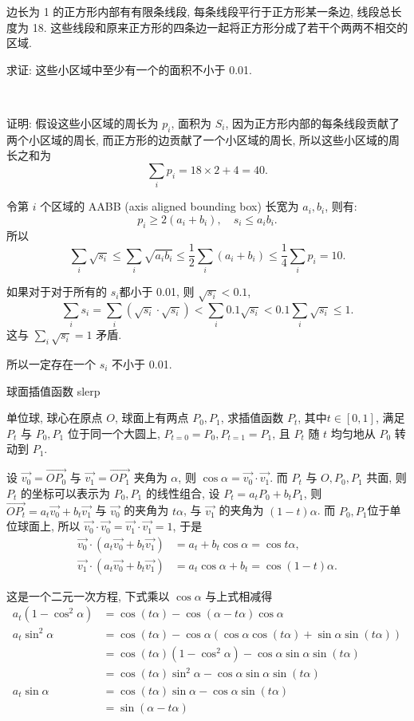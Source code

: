边长为 1 的正方形内部有有限条线段, 
每条线段平行于正方形某一条边, 线段总长度为 18. 
这些线段和原来正方形的四条边一起将正方形分成了若干个两两不相交的区域.

求证: 这些小区域中至少有一个的面积不小于 0.01.

~

证明: 假设这些小区域的周长为 $ p_i $, 面积为 $ S_i $, 因为正方形内部的每条线段贡献了两个小区域的周长, 而正方形的边贡献了一个小区域的周长, 所以这些小区域的周长之和为 
\[ \sum_i{p_i} = 18\times 2 + 4 = 40 .\]

令第 $ i $ 个区域的 AABB (axis aligned bounding box) 长宽为 $ a_i, b_i $, 则有:
\[ p_i \ge 2(a_i+b_i),\quad s_i \le a_i b_i .\]
所以
\[ \sum_i{\sqrt{s_i}} \le \sum_i{\sqrt{a_i b_i}} \le \frac{1}{2}\sum_i{(a_i+b_i)} \le \frac{1}{4}\sum_i{p_i} = 10 .\]

如果对于对于所有的 $ s_i $都小于 0.01, 则 $ \sqrt{s_i} < 0.1 $, 
\[ \sum_i{s_i} = \sum_i{(\sqrt{s_i}\cdot\sqrt{s_i})} < \sum_i{0.1\sqrt{s_i}} < 0.1\sum_i{\sqrt{s_i}} \le 1 .\]
这与 $ \sum_i{\sqrt{s_i}} = 1 $ 矛盾.

所以一定存在一个 $ s_i $ 不小于 0.01.

\newpage

\noindent 球面插值函数 slerp 

单位球, 球心在原点 $O$, 球面上有两点 $P_0, P_1$, 求插值函数 $P_t$, 其中$t\in[0,1]$, 满足 $P_t$ 与 $P_0, P_1$ 位于同一个大圆上, $P_{t=0} = P_0, P_{t=1}=P_1$, 且 $P_t$ 随 $t$ 均匀地从 $P_0$ 转动到 $P_1$. 

设 $\vec{v_0} = \vec{OP_0}$ 与 $\vec{v_1} = \vec{OP_1}$ 夹角为 $\alpha$, 则 $\cos\alpha = \vec{v_0}\cdot\vec{v_1}$. 而 $P_t$ 与 $O,P_0, P_1$ 共面, 则 $P_t$ 的坐标可以表示为 $P_0, P_1$ 的线性组合, 设 $P_t = a_t P_0 + b_tP_1$, 则 $\vec{OP_t} = a_t \vec{v_0} + b_t \vec{v_1}$ 与 $\vec{v_0}$ 的夹角为 $t\alpha$, 与 $\vec{v_1}$ 的夹角为 $(1-t)\alpha$. 而 $P_0, P_1$位于单位球面上, 所以 $\vec{v_0}\cdot\vec{v_0}=\vec{v_1}\cdot\vec{v_1} = 1$, 于是
\begin{align*}
\vec{v_0}\cdot(a_t \vec{v_0} + b_t \vec{v_1}) &= a_t + b_t\cos\alpha = \cos t\alpha ,\\
\vec{v_1}\cdot(a_t \vec{v_0} + b_t \vec{v_1}) &= a_t\cos\alpha + b_t = \cos (1-t)\alpha .
\end{align*}

这是一个二元一次方程, 下式乘以 $\cos\alpha$ 与上式相减得
\begin{align*}
a_t(1-\cos^2\alpha) &= \cos(t\alpha) - \cos(\alpha-t\alpha) \cos\alpha \\
a_t\sin^2\alpha &= \cos(t\alpha) - \cos\alpha(\cos\alpha\cos(t\alpha)+\sin\alpha\sin(t\alpha))\\
 &= \cos(t\alpha)(1-\cos^2\alpha) - \cos\alpha\sin\alpha\sin(t\alpha)\\
&= \cos(t\alpha)\sin^2\alpha - \cos\alpha\sin\alpha\sin(t\alpha)\\
a_t\sin\alpha &= \cos(t\alpha)\sin\alpha - \cos\alpha\sin(t\alpha)\\
&= \sin(\alpha-t\alpha)
\end{align*}

